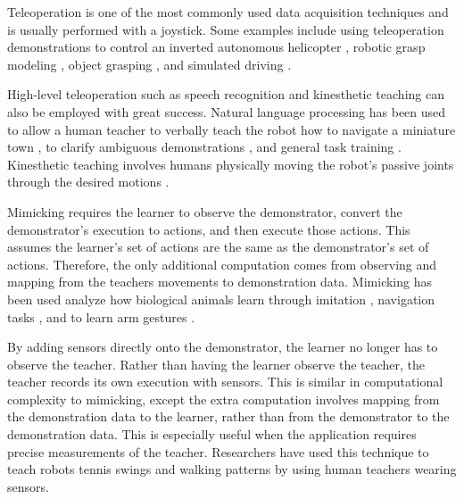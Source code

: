 \documentclass{article}
\begin{document}
Teleoperation is one of the most commonly used data acquisition techniques \cite{Argall:2009:SRL:1523530.1524008} and is usually performed with a joystick. Some examples include using teleoperation demonstrations to control an inverted autonomous helicopter \cite{Ng04invertedautonomous}, robotic grasp modeling \cite{Sweeney07amodel}, object grasping \cite{Pook93recognizingteleoperated}, and simulated driving \cite{Abbeel:2004:ALV:1015330.1015430}. 

High-level teleoperation such as speech recognition and kinesthetic teaching can also be employed with great success. Natural language processing has been used to allow a human teacher to verbally teach the robot how to navigate a miniature town \cite{DBLP:journals/ras/LauriaBKK02}, to clarify ambiguous demonstrations \cite{journals/ras/BreazealBBGT06}, and general task training \cite{Rybski_2007_5670}. Kinesthetic teaching involves humans physically moving the robot's passive joints through the desired motions \cite{akgun12hri}.

Mimicking requires the learner to observe the demonstrator, convert the demonstrator's execution to actions, and then execute those actions. This assumes the learner's set of actions are the same as the demonstrator's set of actions. Therefore, the only additional computation comes from observing and mapping from the teachers movements to demonstration data. Mimicking has been used analyze how biological animals learn through imitation \cite{Demiris:2002:IDP:762896.762910}, navigation tasks \cite{4399087, 976257}, and to learn arm gestures \cite{1490964}. 

By adding sensors directly onto the demonstrator, the learner no longer has to observe the teacher. Rather than having the learner observe the teacher, the teacher records its own execution with sensors. This is similar in computational complexity to mimicking, except the extra computation involves mapping from the demonstration data to the learner, rather than from the demonstrator to the demonstration data.  This is especially useful when the application requires precise measurements of the teacher. Researchers have used this technique to teach robots tennis swings \cite{1014739} and walking patterns \cite{Nakanishi04learningfrom} by using human teachers wearing sensors.
\end{document}
